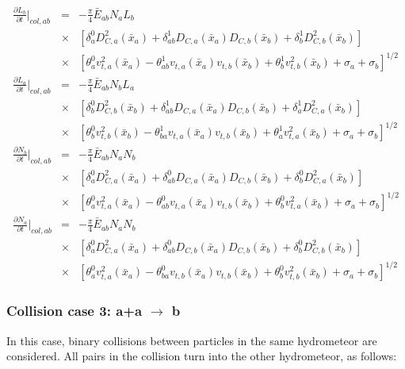 \begin{eqnarray}
\frac{\partial L_{b}}{\partial t}\Bigr|_{col,ab}&=&-\frac{\pi}{4}\bar{E}_{ab}{N_{a}}{L_{b}}\nonumber\\
&\times&[\delta_{a}^{0}D_{C,a}^{2}(\bar{x}_{a})+\delta_{ab}^{1}D_{C,a}(\bar{x}_{a})D_{C,b}(\bar{x}_{b})+\delta_{b}^{1}D_{C,b}^{2}(\bar{x}_{b})]\label{sn195}\\
&\times&[\theta_{a}^{0}v_{t,a}^{2}(\bar{x}_{a})-\theta_{ab}^{1}v_{t,a}(\bar{x}_{a})v_{t,b}(\bar{x}_{b})+\theta_{b}^{1}v_{t,b}^{2}(\bar{x}_{b})+\sigma_{a}+\sigma_{b}]^{1/2}\nonumber\\
\frac{\partial L_{a}}{\partial t}\Bigr|_{col,ab}&=&-\frac{\pi}{4}\bar{E}_{ab}{N_{b}}{L_{a}}\nonumber\\
&\times&[\delta_{b}^{0}D_{C,b}^{2}(\bar{x}_{b})+\delta_{ab}^{1}D_{C,a}(\bar{x}_{a})D_{C,b}(\bar{x}_{b})+\delta_{a}^{1}D_{C,a}^{2}(\bar{x}_{b})]\label{sn196}\\
&\times&[\theta_{b}^{0}v_{t,b}^{2}(\bar{x}_{b})-\theta_{ba}^{1}v_{t,a}(\bar{x}_{a})v_{t,b}(\bar{x}_{b})+\theta_{a}^{1}v_{t,a}^{2}(\bar{x}_{b})+\sigma_{a}+\sigma_{b}]^{1/2}\nonumber\\
\frac{\partial N_{b}}{\partial t}\Bigr|_{col,ab}&=&-\frac{\pi}{4}\bar{E}_{ab}{N_{a}}{N_{b}}\nonumber\\
&\times&[\delta_{a}^{0}D_{C,a}^{2}(\bar{x}_{a})+\delta_{ab}^{0}D_{C,a}(\bar{x}_{a})D_{C,b}(\bar{x}_{b})+\delta_{b}^{0}D_{C,a}^{2}(\bar{x}_{b})]\label{sn197}\\
&\times&[\theta_{a}^{0}v_{t,a}^{2}(\bar{x}_{a})-\theta_{ab}^{0}v_{t,a}(\bar{x}_{a})v_{t,b}(\bar{x}_{b})+\theta_{b}^{0}v_{t,a}^{2}(\bar{x}_{b})+\sigma_{a}+\sigma_{b}]^{1/2}\nonumber\\
\frac{\partial N_{a}}{\partial t}\Bigr|_{col,ab}&=&-\frac{\pi}{4}\bar{E}_{ab}{N_{a}}{N_{b}}\nonumber\\
&\times&[\delta_{a}^{0}D_{C,a}^{2}(\bar{x}_{a})+\delta_{ab}^{0}D_{C,b}(\bar{x}_{a})D_{C,b}(\bar{x}_{b})+\delta_{b}^{0}D_{C,b}^{2}(\bar{x}_{b})]\label{sn198}\\
&\times&[\theta_{a}^{0}v_{t,a}^{2}(\bar{x}_{a})-\theta_{ba}^{0}v_{t,b}(\bar{x}_{a})v_{t,b}(\bar{x}_{b})+\theta_{b}^{0}v_{t,b}^{2}(\bar{x}_{b})+\sigma_{a}+\sigma_{b}]^{1/2}\nonumber
\end{eqnarray}

\subsubsection{Collision case 3: a+a $\rightarrow$ b}
In this case, binary collisions between particles in the same hydrometeor are considered. All pairs in the collision turn into the other hydrometeor, as follows:

